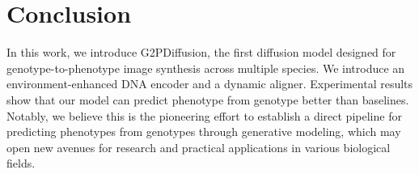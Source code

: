 \section{Conclusion}
\label{sec:Conclusion}
In this work, we introduce G2PDiffusion, the first diffusion model designed for genotype-to-phenotype image synthesis across multiple species.
We introduce an environment-enhanced DNA encoder and a dynamic aligner.
Experimental results show that our model can predict phenotype from genotype better than baselines.
Notably, we believe this is the pioneering effort to establish a direct pipeline for predicting phenotypes from genotypes through generative modeling, which may open new avenues for research and practical applications in various biological fields.

